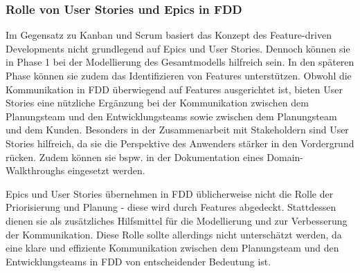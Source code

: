 \documentclass[acmtog]{acmart}
\begin{document}

\subsubsection{Rolle von User Stories und Epics in FDD}

Im Gegensatz zu Kanban und Scrum basiert das Konzept des Feature-driven Developments nicht grundlegend auf Epics und User Stories.
Dennoch können sie  in Phase 1 bei der Modellierung des Gesamtmodells hilfreich sein.
In den späteren Phase können sie zudem das Identifizieren von Features unterstützen.
Obwohl die Kommunikation in FDD überwiegend auf Features ausgerichtet ist, bieten User Stories eine nützliche Ergänzung bei der Kommunikation zwischen dem Planungsteam und den Entwicklungsteams sowie zwischen dem Planungsteam und dem Kunden.
Besonders in der Zusammenarbeit mit Stakeholdern sind User Stories hilfreich, da sie die Perspektive des Anwenders stärker in den Vordergrund rücken.
Zudem können sie bspw. in der Dokumentation eines Domain-Walkthroughs eingesetzt werden.

Epics und User Stories übernehmen in FDD üblicherweise nicht die Rolle der Priorisierung und Planung - diese wird durch Features abgedeckt. Stattdessen dienen sie als zusätzliches Hilfsmittel für die Modellierung und zur Verbesserung der Kommunikation. Diese Rolle sollte allerdings nicht unterschätzt werden, da eine klare und effiziente Kommunikation zwischen dem Planungsteam und den Entwicklungsteams in FDD von entscheidender Bedeutung ist.
\end{document}
